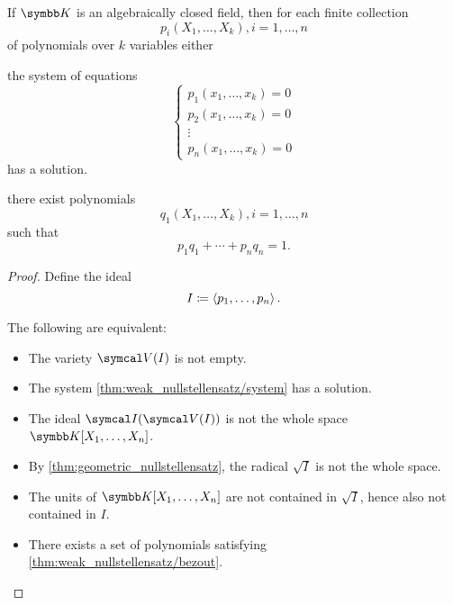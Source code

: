 \begin{corollary}\label{thm:weak_nullstellensatz}\cite{Tao:nullstellensatz}
  If \( \K \) is an algebraically closed field, then for each finite collection
  \begin{equation*}
    p_i(X_1, \ldots, X_k), i = 1, \ldots, n
  \end{equation*}
  of polynomials over \( k \) variables either
  \begin{itemize}
     the system of equations
    \begin{equation}\label{thm:weak_nullstellensatz/system}
      \begin{cases}
        p_1(x_1, \ldots, x_k) = 0 \\
        p_2(x_1, \ldots, x_k) = 0 \\
        \vdots \\
        p_n(x_1, \ldots, x_k) = 0
      \end{cases}
    \end{equation}
    has a solution.

     there exist polynomials
    \begin{equation*}
      q_1(X_1, \ldots, X_k), i = 1, \ldots, n
    \end{equation*}
    such that
    \begin{equation*}
      p_1 q_1 + \cdots + p_n q_n = 1.
    \end{equation*}
  \end{itemize}
\end{corollary}
\begin{proof}
  Define the ideal
  \begin{equation*}
    I \coloneqq \left\langle p_1, \ldots, p_n \right\rangle.
  \end{equation*}

  The following are equivalent:
  \begin{itemize}
    \item The variety \( \Cal{V}(I) \) is not empty.
    \item The system \cref{thm:weak_nullstellensatz/system} has a solution.
    \item The ideal \( \Cal{I}(\Cal{V}(I)) \) is not the whole space \( \K[X_1, \ldots, X_n] \).
    \item By \cref{thm:geometric_nullstellensatz}, the radical \( \sqrt I \) is not the whole space.
    \item The units of \( \K[X_1, \ldots, X_n] \) are not contained in \( \sqrt I \), hence also not contained in \( I \).
    \item There exists a set of polynomials satisfying \cref{thm:weak_nullstellensatz/bezout}.
  \end{itemize}
\end{proof}

